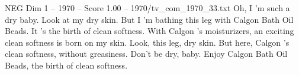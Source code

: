 \begin{textsample}{NEG Dim 1 – 1970 – Score 1.00 – 1970/tv\_com\_1970\_33.txt}  \label{ex:f1_neg_063}
Oh, I 'm such a dry baby.
Look at my dry skin.
But I 'm bathing this leg with Calgon Bath Oil Beads.
It 's the birth of clean softness.
With Calgon 's moisturizers, an exciting clean softness is born on my skin.
Look, this leg, dry skin.
But here, Calgon 's clean softness, without greasiness.
Don't be dry, baby.
Enjoy Calgon Bath Oil Beads, the birth of clean softness.

\end{textsample}
